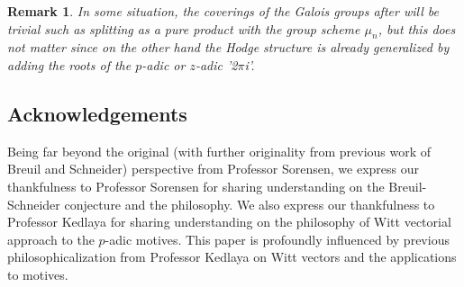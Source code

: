 \documentclass[12pt]{article}
\newtheorem{remark}{Remark}
\theoremstyle{definition}
\begin{document}
\begin{remark}
In some situation, the coverings of the Galois groups after \cite{BSB} will be trivial such as splitting as a pure product with the group scheme $\mu_n$, but this does not matter since on the other hand the Hodge structure is already generalized by adding the roots of the $p$-adic or $z$-adic '2$\pi$i'.
\end{remark}


\newpage
\subsection*{Acknowledgements}
Being far beyond the original (with further originality from previous work of Breuil and Schneider) perspective from Professor Sorensen, we express our thankfulness to Professor Sorensen for sharing understanding on the Breuil-Schneider conjecture and the philosophy. We also express our thankfulness to Professor Kedlaya for sharing understanding on the philosophy of Witt vectorial approach to the $p$-adic motives. This paper is profoundly influenced by previous philosophicalization from Professor Kedlaya on Witt vectors and the applications to motives.
\end{document}

